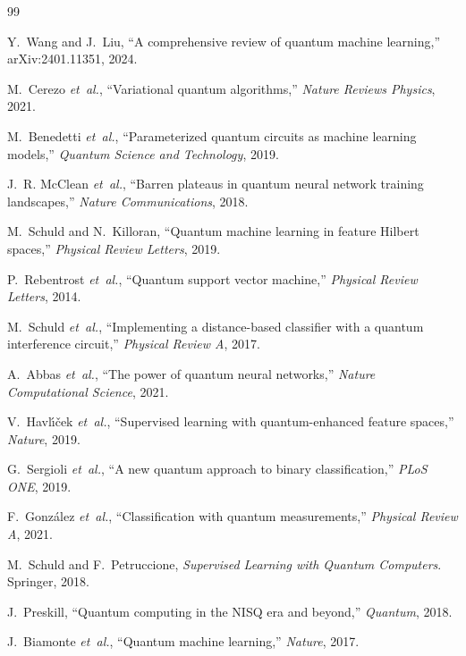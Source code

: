 \documentclass[conference]{IEEEtran}
\begin{document}

\begin{thebibliography}{99}

Y.~Wang and J.~Liu, ``A comprehensive review of quantum machine learning,'' arXiv:2401.11351, 2024.

M.~Cerezo \emph{et~al.}, ``Variational quantum algorithms,'' \emph{Nature Reviews Physics}, 2021.

M.~Benedetti \emph{et~al.}, ``Parameterized quantum circuits as machine learning models,'' \emph{Quantum Science and Technology}, 2019.

J.~R. McClean \emph{et~al.}, ``Barren plateaus in quantum neural network training landscapes,'' \emph{Nature Communications}, 2018.

M.~Schuld and N.~Killoran, ``Quantum machine learning in feature Hilbert spaces,'' \emph{Physical Review Letters}, 2019.

P.~Rebentrost \emph{et~al.}, ``Quantum support vector machine,'' \emph{Physical Review Letters}, 2014.

M.~Schuld \emph{et~al.}, ``Implementing a distance-based classifier with a quantum interference circuit,'' \emph{Physical Review A}, 2017.

A.~Abbas \emph{et~al.}, ``The power of quantum neural networks,'' \emph{Nature Computational Science}, 2021.

V.~Havl\'{\i}\v{c}ek \emph{et~al.}, ``Supervised learning with quantum-enhanced feature spaces,'' \emph{Nature}, 2019.

G.~Sergioli \emph{et~al.}, ``A new quantum approach to binary classification,'' \emph{PLoS ONE}, 2019.

F.~Gonz\'alez \emph{et~al.}, ``Classification with quantum measurements,'' \emph{Physical Review A}, 2021.

M.~Schuld and F.~Petruccione, \emph{Supervised Learning with Quantum Computers}. Springer, 2018.

J.~Preskill, ``Quantum computing in the NISQ era and beyond,'' \emph{Quantum}, 2018.

J.~Biamonte \emph{et~al.}, ``Quantum machine learning,'' \emph{Nature}, 2017.


\end{thebibliography}
\end{document}
